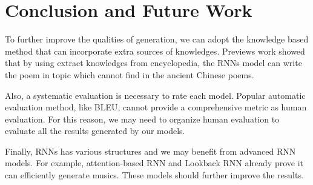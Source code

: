 \section{Conclusion and Future Work} 


To further improve the qualities of generation, we can adopt the knowledge based method that can incorporate extra sources of knowledges. Previews work \cite{wang2016baidu} showed that by using extract knowledges from encyclopedia, the RNNs model can write the poem in topic which cannot find in the ancient Chinese poems. 

Also, a systematic evaluation is necessary to rate each model. Popular automatic evaluation method, like BLEU, cannot provide a comprehensive metric as human evaluation\cite{iu2016evaluate}. For this reason, we may need to organize human evaluation to evaluate all the results generated by our models.

Finally, RNNs has various structures and we may benefit from advanced RNN models. For example, attention-based RNN and Lookback RNN \cite{lookbackRNN} already prove it can efficiently generate musics. These models should further improve the results.